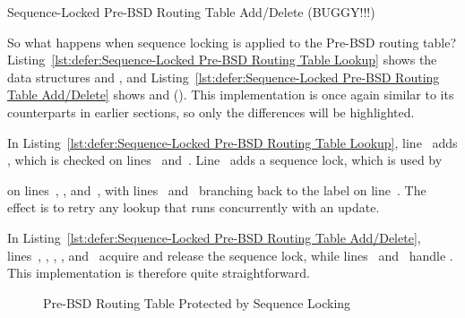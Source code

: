 \begin{listing}

\caption{Sequence-Locked Pre-BSD Routing Table Add\slash Delete (BUGGY!!!)}
\label{lst:defer:Sequence-Locked Pre-BSD Routing Table Add/Delete}
\end{listing}

So what happens when sequence locking is applied to the Pre-BSD
routing table?
Listing~\ref{lst:defer:Sequence-Locked Pre-BSD Routing Table Lookup}
shows the data structures and , and
Listing~\ref{lst:defer:Sequence-Locked Pre-BSD Routing Table Add/Delete}
shows  and  ().
This implementation is once again similar to its counterparts in earlier
sections, so only the differences will be highlighted.

\begin{fcvref}
In
Listing~\ref{lst:defer:Sequence-Locked Pre-BSD Routing Table Lookup},
line~ adds , which is checked on
lines~ and~.
Line~ adds a sequence lock, which is used by 
\end{fcvref}
\begin{fcvref}
on lines~, , and~,
with lines~ and~ branching back to
the  label on line~.
The effect is to retry any lookup that runs concurrently with an update.
\end{fcvref}

\begin{fcvref}
In
Listing~\ref{lst:defer:Sequence-Locked Pre-BSD Routing Table Add/Delete},
lines~, , ,
, and~
acquire and release the sequence lock,
while lines~ and~ handle .
This implementation is therefore quite straightforward.
\end{fcvref}

\begin{figure}
\centering
{}
\caption{Pre-BSD Routing Table Protected by Sequence Locking}
\label{fig:defer:Pre-BSD Routing Table Protected by Sequence Locking}
\end{figure}

